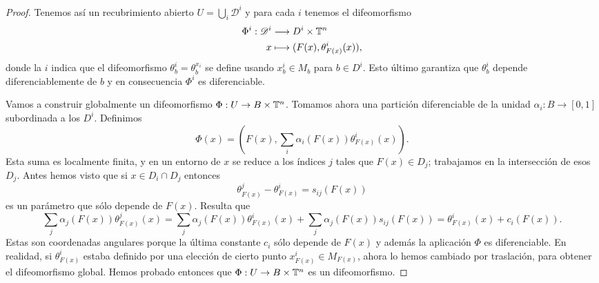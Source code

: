 \begin{proof}
     Tenemos así un recubrimiento abierto $U=\bigcup_i \mathscr D^i$ y para cada $i$ tenemos el difeomorfismo
       \begin{align*}
	 \Phi^i :\mathscr{D}^i&\longrightarrow D^i\times \mathbb{T}^n\\ 
	 x &\longmapsto (F(x),\theta^i_{F(x)}(x)),
	 \end{align*}
	 donde la $i$ indica que el difeomorfismo $\theta^i_b=\theta^{x_i}_b$ se define usando $x^i_b\in M_b$ para $b\in D^i$. Esto último garantiza que $\theta^i_b$ depende diferenciablemente de $b$ y en consecuencia $\Phi^i$ es diferenciable. 
	 \begin{center}
	 \end{center}
	 
	 Vamos a construir globalmente un difeomorfismo $\Phi:U\rightarrow B\times \mathbb{T}^n$. Tomamos ahora  una partición diferenciable de la unidad $\alpha_i:B\rightarrow [0,1]$ subordinada a los $D^i$. Definimos
	 \begin{equation*}
	   \Phi(x)=\left( F(x),\sum_i\alpha_i(F(x))\theta^i_{F(x)}(x) \right).
	 \end{equation*}
	 Esta suma es localmente finita, y en un entorno de $x$ se reduce a los índices $j$ tales que $F(x)\in D_j$; trabajamos en la intersección de esos $D_j$. Antes hemos visto que si $x\in D_i \cap D_j$ entonces 
	 \begin{equation*}
	   \theta^j_{F(x)}-\theta^i_{F(x)}=s_{ij}(F(x))
	 \end{equation*}
	 es un parámetro que sólo depende de $F(x)$. Resulta que
	 \begin{equation*}
	   \sum_j \alpha_j(F(x))\theta^j_{F(x)}(x)=\sum_j \alpha_j(F(x))\theta^i_{F(x)}(x)+\sum_j \alpha_j(F(x))s_{ij}(F(x))=\theta^i_{F(x)}(x)+c_i(F(x)).
	 \end{equation*}
	 Estas son coordenadas angulares porque la última constante $c_i$ sólo depende de $F(x)$ y además la aplicación $\Phi$ es diferenciable. En realidad, si $\theta^i_{F(x)}$ estaba definido por una elección de cierto punto $x^i_{F(x)}\in M_{F(x)}$, ahora lo hemos cambiado por traslación, para obtener el difeomorfismo global. Hemos probado entonces que $\Phi:U\rightarrow B\times \mathbb{T}^n$ es un difeomorfismo.
	 

\end{proof}
